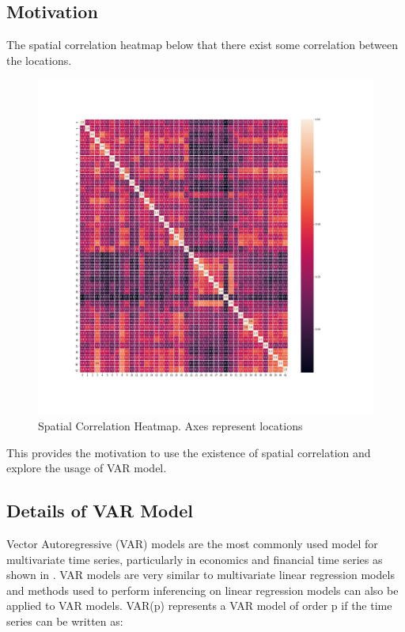 \documentclass[12pt, letterpaper] {article}
\begin{document}
\subsection{Motivation}

The spatial correlation heatmap below that there exist some correlation between the locations. 

\begin{figure}[H]
    \centering
    \includegraphics[width=\textwidth, height=0.9\textheight]{Images/heatmap.jpg}
    \caption{Spatial Correlation Heatmap. Axes represent locations}
    \label{fig:Spatial Correlation Heatmap. Axes represent locations}
\end{figure}

This provides the motivation to use the existence of spatial correlation and explore the usage of VAR model.


\subsection{Details of VAR Model}
Vector Autoregressive (VAR) models are the most commonly used model for multivariate time series, particularly in economics and financial time series as shown in \cite{Hilde2000}. VAR models are very similar to multivariate linear regression models and methods used to perform inferencing on linear regression models can also be applied to VAR models. VAR(p) represents a VAR model of order p if the time series can be written as: 
\end{document}
